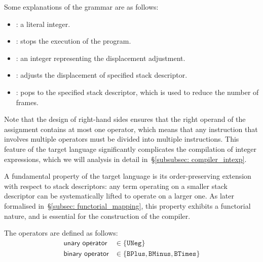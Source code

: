 \documentclass[12pt,a4paper]{report}
\theoremstyle{definition}
\newcommand{\secref}[1]{\S\ref{#1}}
\begin{document}
    Some explanations of the grammar are as follows:
    \begin{itemize}
        \item 
            : a literal integer.
        \item 
            : stops the execution of the program.
        \item 
            \text{\delta}: an integer representing the displacement adjustment.
        \item 
            : adjusts the displacement of specified stack descriptor.
        \item 
            : pops to the specified stack descriptor, which is used to reduce the number of frames.
    \end{itemize}
    Note that the design of right-hand sides ensures that the right operand of the assignment contains at most one operator, which means that any instruction that involves multiple operators must be divided into multiple instructions. This feature of the target language significantly complicates the compilation of integer expressions, which we will analysis in detail in~\secref{subsubsec: compiler_intexp}.

    A fundamental property of the target language is its order-preserving extension with respect to stack descriptors: any term operating on a smaller stack descriptor can be systematically lifted to operate on a larger one. As later formalised in~\secref{subsec: functorial_mapping}, this property exhibits a functorial nature, and is essential for the construction of the compiler.

    The operators are defined as follows:
    \[\begin{aligned}
        \textsf{unary operator} &\in \{\texttt{UNeg}\} \\
        \textsf{binary operator} &\in \{\texttt{BPlus}, \texttt{BMinus}, \texttt{BTimes}\} \\
    \end{aligned}\]
\end{document}
